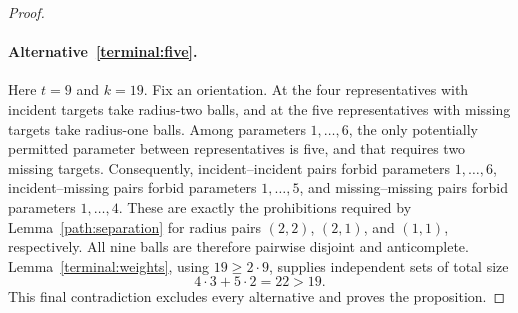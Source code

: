 \begin{proof}
\paragraph{Alternative~\ref{terminal:five}.}
Here \(t=9\) and \(k=19\).
Fix an orientation.  At the four representatives with incident targets
take radius-two balls, and at the five representatives with missing
targets take radius-one balls.
Among parameters \(1,\ldots,6\), the only potentially permitted parameter
between representatives is five, and that requires two missing targets.
Consequently, incident--incident pairs forbid parameters \(1,\ldots,6\),
incident--missing pairs forbid parameters \(1,\ldots,5\), and
missing--missing pairs forbid parameters \(1,\ldots,4\).
These are exactly the prohibitions required by
Lemma~\ref{path:separation} for radius pairs \((2,2)\), \((2,1)\), and
\((1,1)\), respectively.
All nine balls are therefore pairwise disjoint and anticomplete.
Lemma~\ref{terminal:weights}, using \(19\ge2\cdot9\), supplies independent
sets of total size
\[
 4\cdot3+5\cdot2=22>19.
\]
This final contradiction excludes every alternative and proves the
proposition.
\end{proof}
